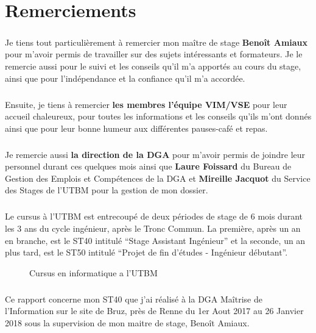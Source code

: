 \documentclass[11pt, book, english, french, standardlists]{upmethodology-document}
\begin{document}
	\chapter*{Remerciements}
		\paragraph*{}
			Je tiens tout particulièrement à remercier mon maître de stage \textbf{Benoît Amiaux} pour m'avoir permis de travailler sur des sujets intéressants et formateurs. Je le remercie aussi pour le suivi et les conseils qu'il m'a apportés au cours du stage, ainsi que pour l'indépendance et la confiance qu'il m'a accordée.
		\paragraph*{}
			Ensuite, je tiens à remercier \textbf{les membres l'équipe VIM/VSE} pour leur accueil chaleureux, pour toutes les informations et les conseils qu'ils m'ont donnés ainsi que pour leur bonne humeur aux différentes pauses-café et repas.
		\paragraph*{}
			Je remercie aussi \textbf{la direction de la DGA} pour m'avoir permis de  joindre leur personnel durant ces quelques mois ainsi que \textbf{Laure Foissard} du Bureau de Gestion des Emplois et Compétences de la DGA et \textbf{Mireille Jacquot} du Service des Stages de l'UTBM pour la gestion de mon dossier.
	\tableofcontents{}
	\listoffigures{}
		\paragraph*{}
			Le cursus à l'\gls{UTBM} est entrecoupé de deux périodes de stage de 6 mois durant les 3 ans du cycle ingénieur, après le Tronc Commun. La première, après un an en branche, est le ST40 intitulé ``Stage Assistant Ingénieur'' et la seconde, un an plus tard, est le ST50 intitulé ``Projet de fin d'études - Ingénieur débutant''.
		\begin{figure}[H]
			\centering%
			\caption{Cursus en informatique a l'\acrshort{UTBM}}%
			\label{fig:Cursus_INFO_UTBM}%
		\end{figure}
		\paragraph*{}
			Ce rapport concerne mon ST40 que j'ai réalisé à la \gls{DGA} Maîtrise de l'Information sur le site de Bruz, près de Renne du 1er Aout 2017 au 26 Janvier 2018 sous la supervision de mon maitre de stage, Benoît Amiaux.
\end{document}
